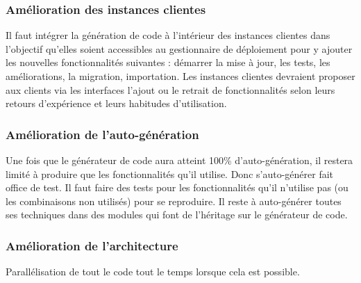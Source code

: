 \subsubsection{Amélioration des instances clientes}

Il faut intégrer la génération de code à l’intérieur des instances clientes dans l’objectif qu’elles soient accessibles au gestionnaire de déploiement pour y ajouter les nouvelles fonctionnalités suivantes : démarrer la mise à jour, les tests, les améliorations, la migration, importation. Les instances clientes devraient proposer aux clients via les interfaces l'ajout ou le retrait de fonctionnalités selon leurs retours d'expérience et leurs habitudes d'utilisation.




\subsubsection{Amélioration de l'auto-génération}

Une fois que le générateur de code aura atteint 100\% d’auto-génération, il restera limité à produire que les fonctionnalités qu’il utilise. Donc s’auto-générer fait office de test. Il faut faire des tests pour les fonctionnalités qu’il n’utilise pas (ou les combinaisons non utilisés) pour se reproduire. Il reste à auto-générer toutes ses techniques dans des modules qui font de l'héritage sur le générateur de code.


\subsubsection{Amélioration de l’architecture}

Parallélisation de tout le code tout le temps lorsque cela est possible.

